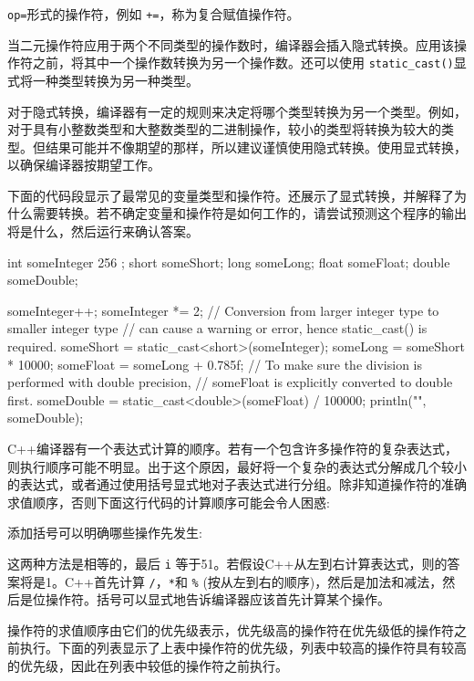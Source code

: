 \verb|op=|形式的操作符，例如 \verb|+=|，称为复合赋值操作符。

当二元操作符应用于两个不同类型的操作数时，编译器会插入隐式转换。应用该操作符之前，将其中一个操作数转换为另一个操作数。还可以使用 \verb|static_cast()|显式将一种类型转换为另一种类型。

对于隐式转换，编译器有一定的规则来决定将哪个类型转换为另一个类型。例如，对于具有小整数类型和大整数类型的二进制操作，较小的类型将转换为较大的类型。但结果可能并不像期望的那样，所以建议谨慎使用隐式转换。使用显式转换，以确保编译器按期望工作。

下面的代码段显示了最常见的变量类型和操作符。还展示了显式转换，并解释了为什么需要转换。若不确定变量和操作符是如何工作的，请尝试预测这个程序的输出将是什么，然后运行来确认答案。

\begin{cpp}
int someInteger { 256 };
short someShort;
long someLong;
float someFloat;
double someDouble;

someInteger++;
someInteger *= 2;
// Conversion from larger integer type to smaller integer type
// can cause a warning or error, hence static_cast() is required.
someShort = static_cast<short>(someInteger);
someLong = someShort * 10000;
someFloat = someLong + 0.785f;
// To make sure the division is performed with double precision,
// someFloat is explicitly converted to double first.
someDouble = static_cast<double>(someFloat) / 100000;
println("{}", someDouble);
\end{cpp}

C++编译器有一个表达式计算的顺序。若有一个包含许多操作符的复杂表达式，则执行顺序可能不明显。出于这个原因，最好将一个复杂的表达式分解成几个较小的表达式，或者通过使用括号显式地对子表达式进行分组。除非知道操作符的准确求值顺序，否则下面这行代码的计算顺序可能会令人困惑:


添加括号可以明确哪些操作先发生:


这两种方法是相等的，最后 \verb|i| 等于51。若假设C++从左到右计算表达式，则的答案将是1。C++首先计算 \verb|/|，\verb|*|和 \verb|%| (按从左到右的顺序)，然后是加法和减法，然后是位操作符。括号可以显式地告诉编译器应该首先计算某个操作。

操作符的求值顺序由它们的优先级表示，优先级高的操作符在优先级低的操作符之前执行。下面的列表显示了上表中操作符的优先级，列表中较高的操作符具有较高的优先级，因此在列表中较低的操作符之前执行。

